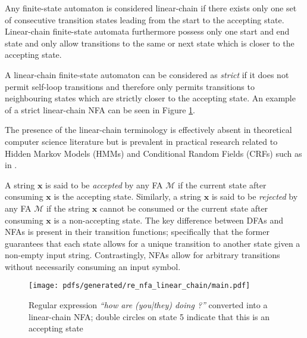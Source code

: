 \begin{definition}
  \label{def:lfa}
  Any finite-state automaton is considered linear-chain if there exists only one
  set of consecutive transition states leading from the start to the accepting
  state. Linear-chain finite-state automata furthermore possess only one start
  and end state and only allow transitions to the same or next state which is
  closer to the accepting state.

  \begin{remark}
    A linear-chain finite-state automaton can be considered as \textit{strict}
    if it does not permit self-loop transitions and therefore only permits
    transitions to neighbouring states which are strictly closer to the
    accepting state. An example of a strict linear-chain NFA can be seen in
    Figure \ref{fig:regex-fsa}.
  \end{remark}

  \begin{remark}
    The presence of the linear-chain terminology is effectively absent in
    theoretical computer science literature but is prevalent in practical
    research related to Hidden Markov Models (HMMs) and Conditional Random
    Fields (CRFs) such as in \citet{tsuruoka2009fast}.
  \end{remark}
  
\end{definition}

A string $\pmb{x}$ is said to be \textit{accepted} by any FA $\mathcal{M}$ if
the current state after consuming $\pmb{x}$ is the accepting state. Similarly, a
string $\pmb{x}$ is said to be \textit{rejected} by any FA $\mathcal{M}$ if the
string $\pmb{x}$ cannot be consumed or the current state after consuming
$\pmb{x}$ is a non-accepting state. The key difference between DFAs and NFAs is
present in their transition functions; specifically that the former guarantees
that each state allows for a unique transition to another state given a
non-empty input string. Contrastingly, NFAs allow for arbitrary transitions
without necessarily consuming an input symbol.

\begin{figure}[t]
  \centering
  \texttt{[image: pdfs/generated/re\_nfa\_linear\_chain/main.pdf]}
  \caption{Regular expression \textit{``how are (you|they) doing ?''} converted
    into a linear-chain NFA; double circles on state 5 indicate that this is an
    accepting state}
  \label{fig:regex-fsa}
\end{figure}

